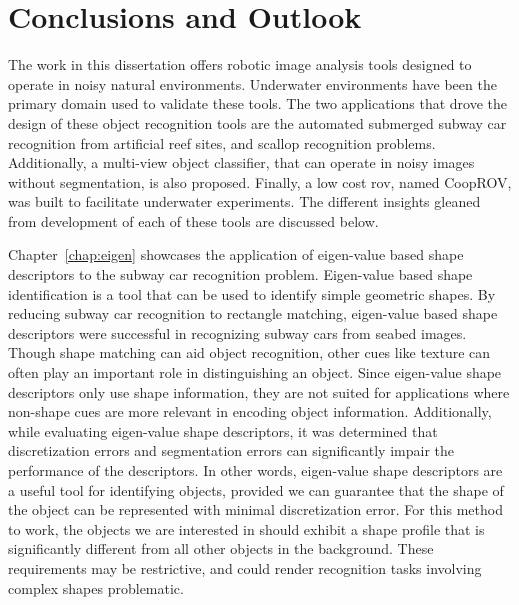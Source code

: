 
\chapter{Conclusions and Outlook}
\label{chap:thesis_conclusion}


The work in this dissertation offers robotic image analysis tools designed to operate in noisy natural environments. 
Underwater environments have been the primary domain used to validate these tools.
The two applications that drove the design of these object recognition tools are the automated submerged subway car recognition
from artificial reef sites, and scallop recognition problems.
Additionally, a multi-view object classifier, that can operate in noisy images without segmentation, is also proposed.
Finally, a low cost \gls{rov}, named CoopROV, was built to facilitate underwater experiments. The different insights gleaned from development of each of these tools are discussed below.

Chapter~\ref{chap:eigen} showcases the application of eigen-value based shape descriptors to the subway car recognition problem. 
Eigen-value based shape identification is a tool that can be used to identify simple geometric shapes. 
By reducing subway car recognition to rectangle matching, eigen-value based shape descriptors were
successful in recognizing subway cars from seabed images.
Though shape matching can aid object recognition, other cues like texture can often play an important role
in distinguishing an object. Since eigen-value shape descriptors only use shape information, 
they are not suited for applications where non-shape cues are more relevant in encoding object information. 
Additionally, while evaluating eigen-value shape descriptors, it was determined that 
discretization errors and segmentation errors can significantly impair the performance of the descriptors.
In other words, eigen-value shape descriptors are a useful tool for identifying
objects, provided we can guarantee that the shape of the object can be represented with minimal discretization error. 
For this method to work, the objects
we are interested in should exhibit a shape profile that is significantly different from
all other objects in the background. These requirements may be restrictive, and could render recognition tasks involving 
complex shapes problematic. 

